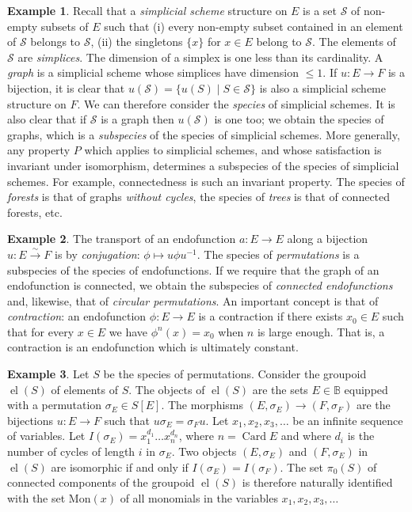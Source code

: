 \documentclass{article}
\theoremstyle{definition}
\newtheorem{ex}{Example}
\theoremstyle{remark}
\newcommand{\B}{\mathbb{B}}
\DeclareMathOperator{\el}{el}
\newcommand{\bij}{\stackrel{\sim}{\rightarrow}}
\DeclareMathOperator{\Card}{Card}
\newcommand{\Mon}{\mathrm{Mon}}
\begin{document}
\newcommand{\Simp}{\mathcal{S}}

\begin{ex}
  Recall that a \emph{simplicial scheme} structure on $E$ is a set
  $\Simp$ of non-empty subsets of $E$ such that (i) every non-empty
  subset contained in an element of $\Simp$ belongs to $\Simp$, (ii)
  the singletons $\{x\}$ for $x \in E$ belong to $\Simp$. The elements
  of $\Simp$ are \emph{simplices}. The dimension of a simplex is one
  less than its cardinality. A \emph{graph} is a simplicial scheme
  whose simplices have dimension $\leq 1$. If $u : E \to F$ is a
  bijection, it is clear that $u (\Simp) = \{u(S) \mid S \in \Simp\}$
  is also a simplicial scheme structure on $F$. We can therefore
  consider the \emph{species} of simplicial schemes. It is also clear
  that if $\Simp$ is a graph then $u(\Simp)$ is one too; we obtain the
  species of graphs, which is a \emph{subspecies} of the species of
  simplicial schemes. More generally, any property $P$ which applies
  to simplicial schemes, and whose satisfaction  is
  invariant under isomorphism, determines a subspecies of the species
  of simplicial schemes. For example, connectedness is such an
  invariant property. The species of \emph{forests} is that of graphs
  \emph{without cycles}, the species of \emph{trees} is that of
  connected forests, etc.
\end{ex}

\begin{ex} \label{ex:endofunctions}
  The transport of an endofunction $a : E \to E$ along a bijection $u
  : E \bij F$ is by \emph{conjugation}: $\phi \mapsto u \phi
  u^{-1}$. The species of \emph{permutations} is a subspecies of the
  species of endofunctions. If we require that the graph of an
  endofunction is connected, we obtain the subspecies of
  \emph{connected endofunctions} and, likewise, that of \emph{circular
    permutations}. An important concept is that of \emph{contraction}:
  an endofunction $\phi : E \to E$ is a contraction if there exists
  $x_0 \in E$ such that for every $x \in E$ we have $\phi^n(x) = x_0$
  when $n$ is large enough. That is, a contraction is an endofunction
  which is ultimately constant.
\end{ex}

\begin{ex}
  Let $S$ be the species of permutations. Consider the groupoid $\el
  (S)$ of elements of $S$. The objects of $\el (S)$ are the sets $E
  \in \B$ equipped with a permutation $\sigma_E \in S [E]$. The
  morphisms $(E, \sigma_E) \to (F, \sigma_F)$ are the bijections $u: E
  \to F$ such that $u\sigma_E = \sigma_F u$. Let $x_1, x_2, x_3,
  \dots$ be an infinite sequence of variables.  Let $I (\sigma_E) =
  x_1^{d_1} \dots x_n^{d_n}$, where $n = \Card E$ and where $d_i$ is
  the number of cycles of length $i$ in $\sigma_E$. Two objects $(E,
  \sigma_E)$ and $(F, \sigma_E)$ in $\el (S)$ are isomorphic if and
  only if $I (\sigma_E) = I (\sigma_F)$. The set $\pi_0(S)$ of
  connected components of the groupoid $\el (S)$ is therefore
  naturally identified with the set $\Mon(x)$ of all monomials in the
  variables $x_1, x_2, x_3, \dots$
\end{ex}
\end{document}
